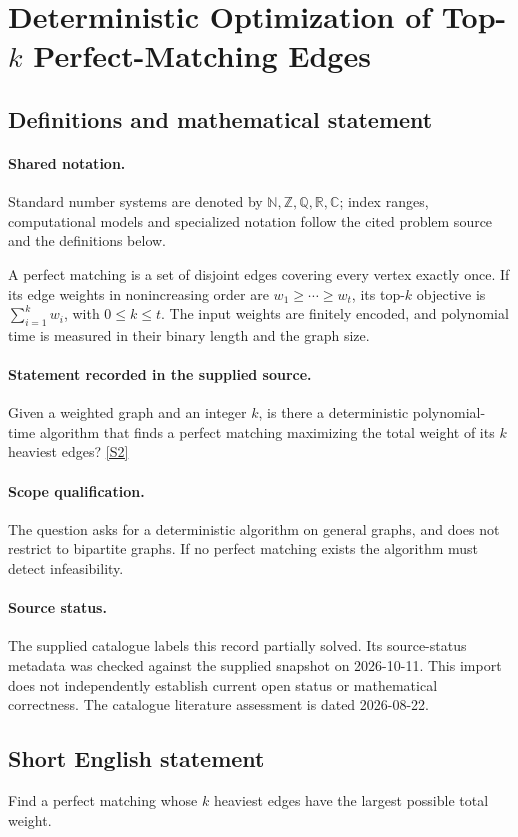\documentclass[11pt]{article}
\newcommand{\sref}[2]{\hyperlink{source:#1:#2}{[S#2]}}
\begin{document}
\section{Deterministic Optimization of Top-$k$ Perfect-Matching Edges}\label{statement}

\subsection{Definitions and mathematical statement}

\paragraph{Shared notation.}Standard number systems are denoted by $\mathbb N,\mathbb Z,\mathbb Q,\mathbb R,\mathbb C$; index ranges, computational models and specialized notation follow the cited problem source and the definitions below.


A perfect matching is a set of disjoint edges covering every vertex exactly once. If its edge weights in nonincreasing order are $w_1\geq\cdots\geq w_t$, its top-$k$ objective is $\sum_{i=1}^kw_i$, with $0\leq k\leq t$. The input weights are finitely encoded, and polynomial time is measured in their binary length and the graph size.
\paragraph{Statement recorded in the supplied source.}
Given a weighted graph and an integer $k$, is there a deterministic polynomial-time algorithm that finds a perfect matching maximizing the total weight of its $k$ heaviest edges? \sref{statement}{2}
\paragraph{Scope qualification.}
The question asks for a deterministic algorithm on general graphs, and does not restrict to bipartite graphs. If no perfect matching exists the algorithm must detect infeasibility.
\paragraph{Source status.}
The supplied catalogue labels this record partially solved. Its source-status metadata was checked against the supplied snapshot on 2026-10-11. This import does not independently establish current open status or mathematical correctness. The catalogue literature assessment is dated 2026-08-22.
\subsection{Short English statement}
Find a perfect matching whose $k$ heaviest edges have the largest possible total weight.
\end{document}
